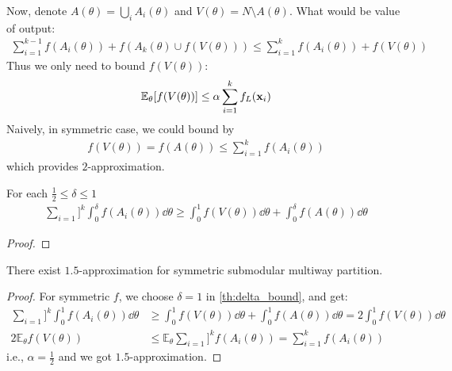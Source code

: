 Now, denote $A(\theta) = \bigcup_i A_i(\theta)$ and $V(\theta) = N \setminus A(\theta)$. What would be value of output:
\begin{align}
\sum_{i=1}^{k-1} f(A_i(\theta)) + f(A_k(\theta) \cup f(V(\theta))) \leq \sum_{i=1}^k f(A_i(\theta)) + f(V(\theta))
\end{align}
Thus we only need to bound $f(V(\theta))$:
\begin{align}
\mathbb{E}_\theta [f(V(\theta))] \leq \alpha \sum_{i=1}^{k} f_L(\vb{x}_i) 
\end{align}
Naively, in symmetric case, we could bound by
\begin{align}
f(V(\theta)) = f(A(\theta)) \leq \sum_{i=1}^{k} f(A_i(\theta))  
\end{align}
which provides $2$-approximation.
\begin{theorem} \label{th:delta_bound}
	For each $\frac{1}{2} \leq \delta \leq 1$
	\begin{align}
	\sum_{i=1}]^k \int_0^\delta f(A_i(\theta)) \dd{\theta} \geq \int_0^1 f(V(\theta)) \dd{\theta} + \int_0^\delta f(A(\theta))\dd{\theta}
	\end{align}
	\begin{proof}
	\end{proof}
\end{theorem}
\begin{theorem}
	There exist $1.5$-approximation for symmetric submodular multiway partition.
	\begin{proof}
	For symmetric $f$, we choose $\delta = 1$ in \cref{th:delta_bound}, and get:
	\begin{align}
	\sum_{i=1}]^k \int_0^1 f(A_i(\theta)) \dd{\theta} &\geq \int_0^1 f(V(\theta)) \dd{\theta} + \int_0^1 f(A(\theta))\dd{\theta} = 2\int_0^1 f(V(\theta)) \dd{\theta}\\ 
	2\mathbb{E}_\theta f(V(\theta)) &\leq  \mathbb{E}_\theta  \sum_{i=1}]^k  f(A_i(\theta)) =  \sum_{i=1}^{k} f(A_i(\theta))  
	\end{align}
	i.e., $\alpha = \frac{1}{2}$ and we got $1.5$-approximation.
	\end{proof}
\end{theorem}

